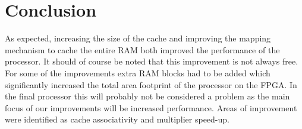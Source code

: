 \documentclass[final]{article}
\begin{document}
\section{Conclusion}
\label{sec:conclusion}
As expected, increasing the size of the cache and improving the mapping mechanism to cache the entire RAM both improved the performance of the processor. It should of course be noted that this improvement is not always free. For some of the improvements extra RAM blocks had to be added which significantly increased the total area footprint of the processor on the FPGA. In the final processor this will probably not be considered a problem as the main focus of our improvements will be increased performance. Areas of improvement were identified as cache associativity and multiplier speed-up.
\end{document}
